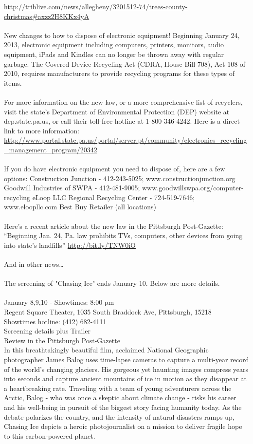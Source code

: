 \documentclass[10pt,a4paper]{article}
\begin{document}
\begin{multicols}{2}
\url{http://triblive.com/news/allegheny/3201512-74/trees-county-christmas#axzz2H8KKx4yA}
\\
\\
New changes to how to dispose of electronic equipment!
Beginning January 24, 2013, electronic equipment including computers, printers, monitors, audio equipment, iPads and Kindles can no longer be thrown away with regular garbage.  The Covered Device Recycling Act (CDRA, House Bill 708), Act 108 of 2010, requires manufacturers to provide recycling programs for these types of items.  
\\
\\
For more information on the new law, or a more comprehensive list of recyclers, visit the state’s Department of Environmental Protection (DEP) website at dep.state.pa.us, or call their toll-free hotline at 1-800-346-4242.  Here is a direct link to more information:
\url{http://www.portal.state.pa.us/portal/server.pt/community/electronics_recycling_management_program/20342}
\\
\\
If you do have electronic equipment you need to dispose of, here are a few options:
Construction Junction - 412-243-5025; www.constructionjunction.org 
Goodwill Industries of SWPA - 412-481-9005; www.goodwillswpa.org/computer-recycling 
eLoop LLC Regional Recycling Center - 724-519-7646; www.eloopllc.com
Best Buy Retailer (all locations)
\\
\\
Here’s a recent article about the new law in the Pittsburgh Post-Gazette: 
“Beginning Jan. 24, Pa. law prohibits TVs, computers, other devices from going into state's landfills”
\url{http://bit.ly/TNW0iO}
\\
\\
And in other news…
\\
\\
The screening of "Chasing Ice" ends January 10.  Below are more details.
\\
\\
January 8,9,10 - Showtimes: 8:00 pm\\
Regent Square Theater, 1035 South Braddock Ave, Pittsburgh, 15218 \\
Showtimes hotline: (412) 682-4111\\
Screening details plus Trailer\\
Review in the Pittsburgh Post-Gazette\\
In this breathtakingly beautiful film, acclaimed National Geographic photographer James Balog uses time-lapse cameras to capture a multi-year record of the world's changing glaciers. His gorgeous yet haunting images compress years into seconds and capture ancient mountains of ice in motion as they disappear at a heartbreaking rate. Traveling with a team of young adventurers across the Arctic, Balog - who was once a skeptic about climate change - risks his career and his well-being in pursuit of the biggest story facing humanity today. As the debate polarizes the country, and the intensity of natural disasters ramps up, Chasing Ice depicts a heroic photojournalist on a mission to deliver fragile hope to this carbon-powered planet. 


\end{multicols}
\end{document}
